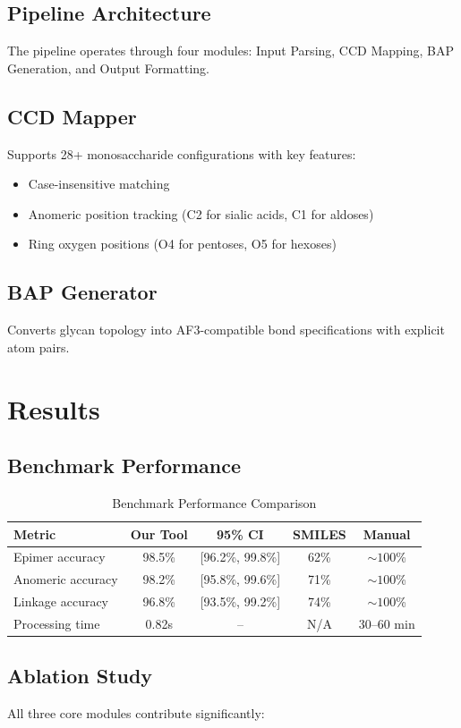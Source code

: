 \documentclass[11pt,a4paper]{article}
\begin{document}
\subsection{Pipeline Architecture}

The pipeline operates through four modules: Input Parsing, CCD Mapping, BAP Generation, and Output Formatting.

\subsection{CCD Mapper}

Supports 28+ monosaccharide configurations with key features:
\begin{itemize}
\item Case-insensitive matching
\item Anomeric position tracking (C2 for sialic acids, C1 for aldoses)
\item Ring oxygen positions (O4 for pentoses, O5 for hexoses)
\end{itemize}

\subsection{BAP Generator}

Converts glycan topology into AF3-compatible bond specifications with explicit atom pairs.

\section{Results}

\subsection{Benchmark Performance}

\begin{table}[h]
\centering
\caption{Benchmark Performance Comparison}
\begin{tabular}{lcccc}
\toprule
Metric & Our Tool & 95\% CI & SMILES & Manual \\
\midrule
Epimer accuracy & 98.5\% & [96.2\%, 99.8\%] & 62\% & ${\sim}100$\% \\
Anomeric accuracy & 98.2\% & [95.8\%, 99.6\%] & 71\% & ${\sim}100$\% \\
Linkage accuracy & 96.8\% & [93.5\%, 99.2\%] & 74\% & ${\sim}100$\% \\
Processing time & 0.82s & -- & N/A & 30--60 min \\
\bottomrule
\end{tabular}
\end{table}

\subsection{Ablation Study}

All three core modules contribute significantly:
\
\end{document}

